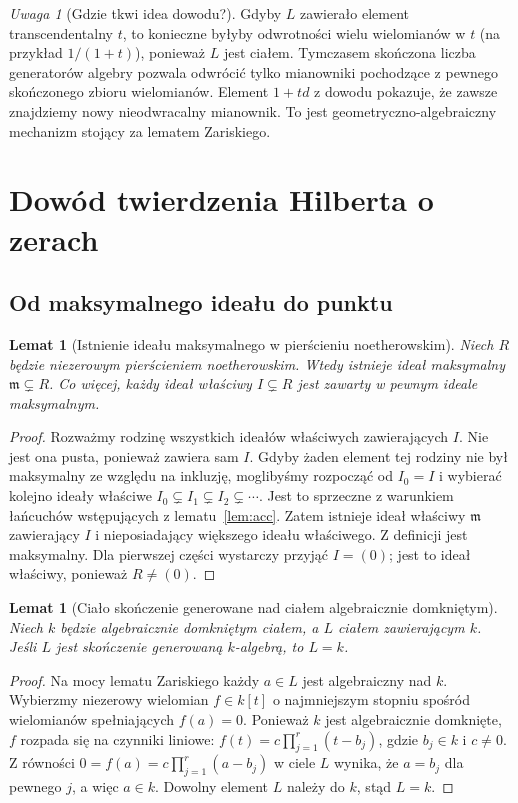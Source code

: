 \documentclass[11pt,a4paper,openany]{report}
\numberwithin{equation}{section}
\theoremstyle{plain}
\newtheorem{lemat}[twierdzenie]{Lemat}
\theoremstyle{definition}
\theoremstyle{remark}
\newtheorem{uwaga}[twierdzenie]{Uwaga}
\begin{document}
\begin{uwaga}[Gdzie tkwi idea dowodu?]
Gdyby $L$ zawierało element transcendentalny $t$, to konieczne
byłyby odwrotności wielu wielomianów w $t$ (na przykład
$1/(1+t)$), ponieważ $L$ jest ciałem.
Tymczasem skończona liczba generatorów algebry pozwala
odwrócić tylko mianowniki pochodzące z pewnego skończonego
zbioru wielomianów. Element $1+t d$ z dowodu pokazuje,
że zawsze znajdziemy nowy nieodwracalny mianownik.
To jest geometryczno-algebraiczny mechanizm stojący za lematem Zariskiego.
\end{uwaga}

\section{Dowód twierdzenia Hilberta o zerach}

\subsection{Od maksymalnego ideału do punktu}

\begin{lemat}[Istnienie ideału maksymalnego w pierścieniu noetherowskim]
\label{lem:maximal-exists}
Niech $R$ będzie niezerowym pierścieniem noetherowskim.
Wtedy istnieje ideał maksymalny $\mathfrak m\subsetneq R$.
Co więcej, każdy ideał właściwy $I\subsetneq R$ jest zawarty
w pewnym ideale maksymalnym.
\end{lemat}
\begin{proof}
Rozważmy rodzinę wszystkich ideałów właściwych zawierających $I$.
Nie jest ona pusta, ponieważ zawiera sam $I$.
Gdyby żaden element tej rodziny nie był maksymalny ze względu na
inkluzję, moglibyśmy rozpocząć od $I_0=I$ i wybierać kolejno
ideały właściwe $I_0\subsetneq I_1\subsetneq I_2\subsetneq\cdots$.
Jest to sprzeczne z warunkiem łańcuchów wstępujących
z lematu~\ref{lem:acc}. Zatem istnieje ideał właściwy
$\mathfrak m$ zawierający $I$ i nieposiadający większego
ideału właściwego. Z definicji jest maksymalny.
Dla pierwszej części wystarczy przyjąć $I=(0)$;
jest to ideał właściwy, ponieważ $R\ne(0)$.
\end{proof}

\begin{lemat}[Ciało skończenie generowane nad ciałem algebraicznie domkniętym]
\label{lem:extension-trivial}
Niech $k$ będzie algebraicznie domkniętym ciałem,
a $L$ ciałem zawierającym $k$.
Jeśli $L$ jest skończenie generowaną $k$-algebrą,
to $L=k$.
\end{lemat}
\begin{proof}
Na mocy lematu Zariskiego każdy $a\in L$ jest algebraiczny
nad $k$. Wybierzmy niezerowy wielomian
$f\in k[t]$ o najmniejszym stopniu spośród wielomianów
spełniających $f(a)=0$. Ponieważ $k$ jest algebraicznie
domknięte, $f$ rozpada się na czynniki liniowe:
$f(t)=c\prod_{j=1}^r(t-b_j)$, gdzie $b_j\in k$ i $c\ne0$.
Z równości
$0=f(a)=c\prod_{j=1}^r(a-b_j)$ w ciele $L$
wynika, że $a=b_j$ dla pewnego $j$, a więc $a\in k$.
Dowolny element $L$ należy do $k$, stąd $L=k$.
\end{proof}
\end{document}

